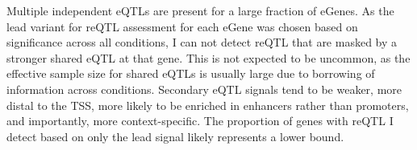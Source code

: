 Multiple independent eQTLs are present for a large fraction of eGenes\autocite{zeng2019ComprehensiveMultipleEQTL}.
As the lead variant for reQTL assessment for each eGene was chosen based on significance across all conditions, I can not detect reQTL that are masked by a stronger shared eQTL at that gene.
This is not expected to be uncommon, as the effective sample size for shared eQTLs is usually large due to borrowing of information across conditions.
Secondary \gls{eQTL} signals tend to be weaker, more distal to the TSS, more likely to be enriched in enhancers rather than promoters, and importantly, more context-specific\autocite{vandiedonck2017GeneticAssociationMolecular,dobbyn2018LandscapeConditionalEQTL,rotival2019CharacterisingGeneticBasis}.
The proportion of genes with reQTL I detect based on only the lead signal likely represents a lower bound.


